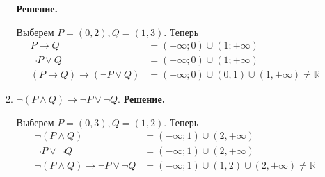\begin{enumerate}
\begin{enumerate}
	\textbf{Решение.}
	
	Выберем $P = (0, 2), Q = (1, 3)$. Теперь 
	\begin{align*}
		P \to Q &= (-\infty; 0) \cup (1; +\infty) \\
		\neg P \lor Q &= (-\infty; 0) \cup (1; +\infty) \\
		(P \to Q) \to (\neg P \lor Q) &= (-\infty; 0) \cup (0, 1) \cup (1, +\infty) \neq \mathbb{R}
	\end{align*}
\item $\neg (P \land Q) \to \neg P \lor \neg Q$.
	\textbf{Решение.}
	
	Выберем $P = (0, 3), Q = (1, 2)$. Теперь
	\begin{align*}
		\neg (P \land Q) &= (-\infty; 1) \cup (2, +\infty) \\
		\neg P \lor \neg Q &= (-\infty; 1) \cup (2, +\infty) \\
		\neg (P \land Q) \to \neg P \lor \neg Q &= (-\infty; 1) \cup (1, 2) \cup (2, +\infty) \neq \mathbb{R}
	\end{align*}

\end{enumerate}

\end{enumerate}

